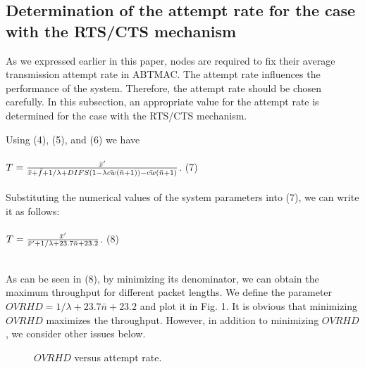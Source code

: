 \documentclass[10pt,twocolumn,oneside,submit]{JCNtran}
\begin{document}
\subsection{Determination of the attempt rate for the case with the RTS/CTS mechanism}
As we expressed earlier in this paper, nodes are required to fix their average transmission attempt rate in ABTMAC. The attempt rate influences the performance of the system. Therefore, the attempt rate should be chosen carefully. In this subsection, an appropriate value for the attempt rate is determined for the case with the RTS/CTS mechanism.

\par Using (4), (5), and (6) we have\\
\\
$T = {\bar x'\over\bar x+\bar f+1/\lambda +DIFS(1-\lambda \bar {cw}(\bar n+1))-\bar {cw}(\bar n+1)}$. \hfill(7) \\
\\
Substituting the numerical values of the system parameters into (7), we can write it as follows:\\
\\
$T = {\bar x'\over\bar x'+1/\lambda +23.7\bar n+23.2}$. \hfill(8) \\
\\
\par As can be seen in (8), by minimizing its denominator, we can obtain the maximum throughput for different packet lengths. We define the parameter $OVRHD=1/\lambda +23.7\bar n+23.2$ and plot it in Fig. 1. It is obvious that minimizing $OVRHD$ maximizes the throughput. However, in addition to minimizing $OVRHD$, we consider other issues below.
\begin{figure}[!t]
\begin{center}
\epsfxsize=8cm \leavevmode{} \caption{$OVRHD$ versus attempt rate.} \label{fig:1}
\end{center}
\end{figure}
\end{document}
